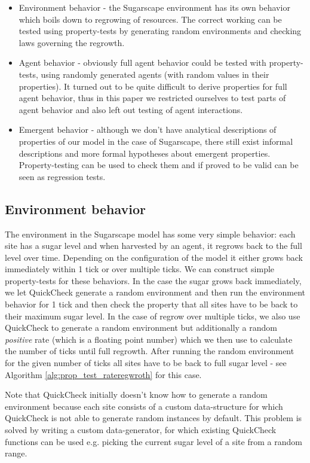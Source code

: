 \begin{itemize}
	\item Environment behavior - the Sugarscape environment has its own behavior which boils down to regrowing of resources. The correct working can be tested using property-tests by generating random environments and checking laws governing the regrowth.
	
	\item Agent behavior - obviously full agent behavior could be tested with property-tests, using randomly generated agents (with random values in their properties). It turned out to be quite difficult to derive properties for full agent behavior, thus in this paper we restricted ourselves to test parts of agent behavior and also left out testing of agent interactions.

	\item Emergent behavior - although we don't have analytical descriptions of properties of our model in the case of Sugarscape, there still exist informal descriptions and more formal hypotheses about emergent properties. Property-testing can be used to check them and if proved to be valid can be seen as regression tests.
\end{itemize}

\subsection{Environment behavior}
The environment in the Sugarscape model has some very simple behavior: each site has a sugar level and when harvested by an agent, it regrows back to the full level over time. Depending on the configuration of the model it either grows back immediately within 1 tick or over multiple ticks. We can construct simple property-tests for these behaviors. In the case the sugar grows back immediately, we let QuickCheck generate a random environment and then run the environment behavior for 1 tick and then check the property that all sites have to be back to their maximum sugar level. In the case of regrow over multiple ticks, we also use QuickCheck to generate a random environment but additionally a random \textit{positive} rate (which is a floating point number) which we then use to calculate the number of ticks until full regrowth. After running the random environment for the given number of ticks all sites have to be back to full sugar level - see Algorithm \ref{alg:prop_test_rateregwroth} for this case.

Note that QuickCheck initially doesn't know how to generate a random environment because each site consists of a custom data-structure for which QuickCheck is not able to generate random instances by default. This problem is solved by writing a custom data-generator, for which existing QuickCheck functions can be used e.g. picking the current sugar level of a site from a random range.

